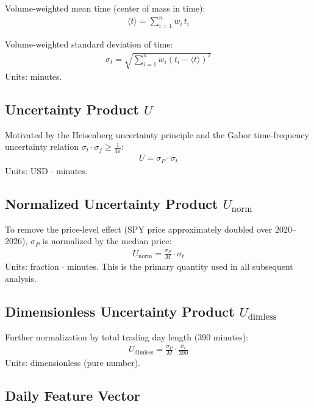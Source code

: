 \documentclass[11pt]{article}
\begin{document}
Volume-weighted mean time (center of mass in time):
\begin{align}
    \langle t \rangle = \sum_{i=1}^{n} w_i\, t_i
\end{align}

Volume-weighted standard deviation of time:
\begin{align}
    \sigma_t = \sqrt{\sum_{i=1}^{n} w_i (t_i - \langle t \rangle)^2}
\end{align}
Units: minutes.

\subsection{Uncertainty Product \texorpdfstring{$U$}{U}}

Motivated by the Heisenberg uncertainty principle and the Gabor time-frequency uncertainty relation $\sigma_t \cdot \sigma_f \geq \frac{1}{4\pi}$:
\begin{align}
    U = \sigma_P \cdot \sigma_t
\end{align}
Units: USD $\cdot$ minutes.

\subsection{Normalized Uncertainty Product \texorpdfstring{$U_\mathrm{norm}$}{U\_norm}}

To remove the price-level effect (SPY price approximately doubled over 2020--2026), $\sigma_P$ is normalized by the median price:
\begin{align}
    U_\mathrm{norm} = \frac{\sigma_P}{M} \cdot \sigma_t
\end{align}
Units: fraction $\cdot$ minutes. This is the primary quantity used in all subsequent analysis.

\subsection{Dimensionless Uncertainty Product \texorpdfstring{$U_\mathrm{dimless}$}{U\_dimless}}

Further normalization by total trading day length (390 minutes):
\begin{align}
    U_\mathrm{dimless} = \frac{\sigma_P}{M} \cdot \frac{\sigma_t}{390}
\end{align}
Units: dimensionless (pure number).

\subsection{Daily Feature Vector}
\end{document}
